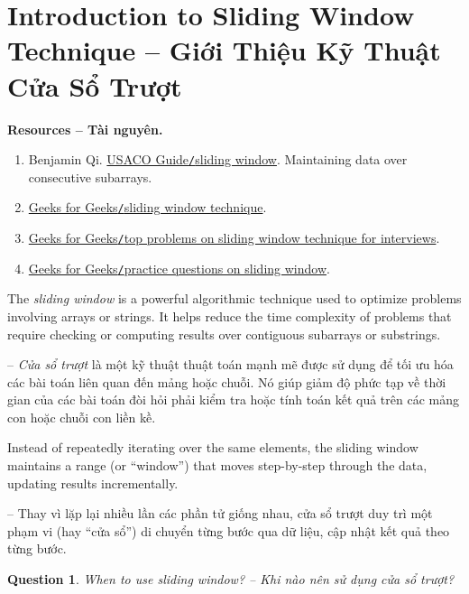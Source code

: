 \documentclass{article}
\newtheorem{question}{Question}
\begin{document}

\section{Introduction to Sliding Window Technique -- Giới Thiệu Kỹ Thuật Cửa Sổ Trượt}
\textbf{\textsf{Resources -- Tài nguyên.}}
\begin{enumerate}
    \item {\sc Benjamin Qi}. \href{https://usaco.guide/gold/sliding-window?lang=cpp}{USACO Guide{\tt/}sliding window}. Maintaining data over consecutive subarrays.

    \item \href{https://www.geeksforgeeks.org/dsa/window-sliding-technique/}{Geeks for Geeks{\tt/}sliding window technique}.

    \item \href{https://www.geeksforgeeks.org/dsa/top-problems-on-sliding-window-technique-for-interviews/}{Geeks for Geeks{\tt/}top problems on sliding window technique for interviews}.

    \item \href{https://www.geeksforgeeks.org/explore?page=2&category=sliding-window&sortBy=submissions}{Geeks for Geeks{\tt/}practice questions on sliding window}.
\end{enumerate}
The {\it sliding window} is a powerful algorithmic technique used to optimize problems involving arrays or strings. It helps reduce the time complexity of problems that require checking or computing results over contiguous subarrays or substrings.

-- {\it Cửa sổ trượt} là một kỹ thuật thuật toán mạnh mẽ được sử dụng để tối ưu hóa các bài toán liên quan đến mảng hoặc chuỗi. Nó giúp giảm độ phức tạp về thời gian của các bài toán đòi hỏi phải kiểm tra hoặc tính toán kết quả trên các mảng con hoặc chuỗi con liền kề.

Instead of repeatedly iterating over the same elements, the sliding window maintains a range (or ``window'') that moves step-by-step through the data, updating results incrementally.

-- Thay vì lặp lại nhiều lần các phần tử giống nhau, cửa sổ trượt duy trì một phạm vi (hay ``cửa sổ'') di chuyển từng bước qua dữ liệu, cập nhật kết quả theo từng bước.

\begin{question}
    When to use sliding window? -- Khi nào nên sử dụng cửa sổ trượt?
\end{question}
\end{document}
